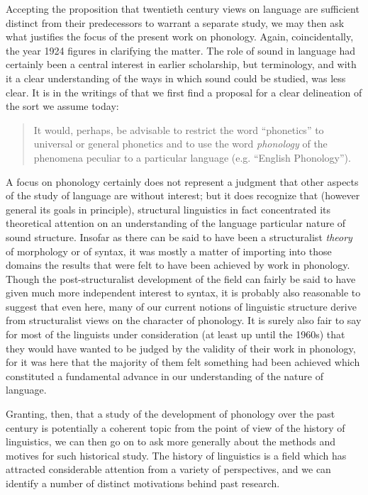 Accepting the proposition that twentieth century views on language are
sufficient distinct from their predecessors to warrant a separate
study, we may then ask what justifies the focus of the present work on
phonology. Again, coincidentally, the year 1924 figures in clarifying
the matter. The role of sound in language had certainly been a central
interest in earlier scholarship, but terminology, and with it a clear
understanding of the ways in which sound could be studied, was less
clear. It is in the writings of  that we first find a
proposal for a clear delineation of the sort we assume today:
\begin{quotation}
  It would, perhaps, be advisable to restrict the word ``phonetics''
  to universal or general phonetics and to use the word
  \emph{phonology} of the phenomena peculiar to a particular language
  (e.g. ``{English} Phonology'').\\
  \citep[35]{jespersen24:philosophy-of-grammar}
\end{quotation}

A focus on phonology certainly does not represent a judgment that
other aspects of the study of language are without interest; but it
does recognize that (however general its goals in principle),
structural linguistics in fact concentrated its theoretical attention
on an understanding of the language particular nature of sound
structure.  Insofar as there can be said to have been a structuralist
\emph{theory} of morphology or of syntax, it was mostly a matter of
importing into those domains the results that were felt to have been
achieved by work in phonology.  Though the post-structuralist
development of the field can fairly be said to have given much more
independent interest to syntax, it is probably also reasonable to
suggest that even here, many of our current notions of linguistic
structure derive from structuralist views on the character of
phonology.  It is surely also fair to say for most of the linguists
under consideration (at least up until the 1960s) that they would have
wanted to be judged by the validity of their work in phonology, for it
was here that the majority of them felt something had been achieved
which constituted a fundamental advance in our understanding of the
nature of language.

Granting, then, that a study of the development of phonology over the
past century is potentially a coherent topic from the point of view of
the history of linguistics, we can then go on to ask more generally
about the methods and motives for such historical study.  The history
of linguistics is a field which has attracted considerable attention
from a variety of perspectives, and we can identify a number of
distinct motivations behind past research. 


